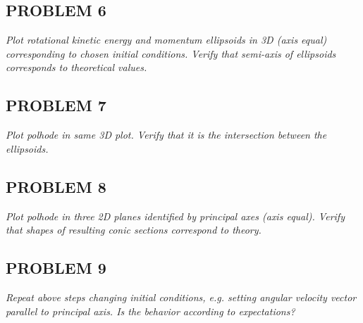 \subsection{PROBLEM 6}
\textit{Plot rotational kinetic energy and momentum ellipsoids in 3D (axis equal) corresponding to chosen initial conditions. Verify that semi-axis of ellipsoids corresponds to theoretical values.}


\subsection{PROBLEM 7}
\textit{Plot polhode in same 3D plot. Verify that it is the intersection between the ellipsoids.}


\subsection{PROBLEM 8}
\textit{Plot polhode in three 2D planes identified by principal axes (axis equal). Verify that shapes of resulting conic sections correspond to theory.}


\subsection{PROBLEM 9}
\textit{Repeat above steps changing initial conditions, e.g. setting angular velocity vector parallel to principal axis. Is the behavior according to expectations?}